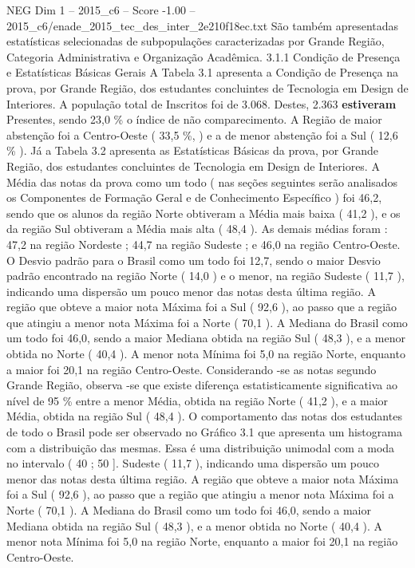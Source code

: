 \begin{textsample}{NEG Dim 1 – 2015\_c6 – Score -1.00 – 2015\_c6/enade\_2015\_tec\_des\_inter\_2e210f18ec.txt}
São também apresentadas estatísticas selecionadas de subpopulações caracterizadas por Grande Região, Categoria Administrativa e Organização Acadêmica. 3.1.1 Condição de Presença e Estatísticas Básicas Gerais A Tabela 3.1 apresenta a Condição de Presença na prova, por Grande Região, dos estudantes concluintes de Tecnologia em Design de Interiores.
A população total de Inscritos foi de 3.068.
Destes, 2.363 \textbf{estiveram} Presentes, sendo 23,0 \% o índice de não comparecimento.
A Região de maior abstenção foi a Centro-Oeste ( 33,5 \%, ) e a de menor abstenção foi a Sul ( 12,6 \% ).
Já a Tabela 3.2 apresenta as Estatísticas Básicas da prova, por Grande Região, dos estudantes concluintes de Tecnologia em Design de Interiores.
A Média das notas da prova como um todo ( nas seções seguintes serão analisados os Componentes de Formação Geral e de Conhecimento Específico ) foi 46,2, sendo que os alunos da região Norte obtiveram a Média mais baixa ( 41,2 ), e os da região Sul obtiveram a Média mais alta ( 48,4 ).
As demais médias foram : 47,2 na região Nordeste ; 44,7 na região Sudeste ; e 46,0 na região Centro-Oeste.
O Desvio padrão para o Brasil como um todo foi 12,7, sendo o maior Desvio padrão encontrado na região Norte ( 14,0 ) e o menor, na região Sudeste ( 11,7 ), indicando uma dispersão um pouco menor das notas desta última região.
A região que obteve a maior nota Máxima foi a Sul ( 92,6 ), ao passo que a região que atingiu a menor nota Máxima foi a Norte ( 70,1 ).
A Mediana do Brasil como um todo foi 46,0, sendo a maior Mediana obtida na região Sul ( 48,3 ), e a menor obtida no Norte ( 40,4 ).
A menor nota Mínima foi 5,0 na região Norte, enquanto a maior foi 20,1 na região Centro-Oeste.
Considerando -se as notas segundo Grande Região, observa -se que existe diferença estatisticamente significativa ao nível de 95 \% entre a menor Média, obtida na região Norte ( 41,2 ), e a maior Média, obtida na região Sul ( 48,4 ).
O comportamento das notas dos estudantes de todo o Brasil pode ser observado no Gráfico 3.1 que apresenta um histograma com a distribuição das mesmas.
Essa é uma distribuição unimodal com a moda no intervalo ( 40 ; 50 ].
Sudeste ( 11,7 ), indicando uma dispersão um pouco menor das notas desta última região.
A região que obteve a maior nota Máxima foi a Sul ( 92,6 ), ao passo que a região que atingiu a menor nota Máxima foi a Norte ( 70,1 ).
A Mediana do Brasil como um todo foi 46,0, sendo a maior Mediana obtida na região Sul ( 48,3 ), e a menor obtida no Norte ( 40,4 ).
A menor nota Mínima foi 5,0 na região Norte, enquanto a maior foi 20,1 na região Centro-Oeste.

\end{textsample}
